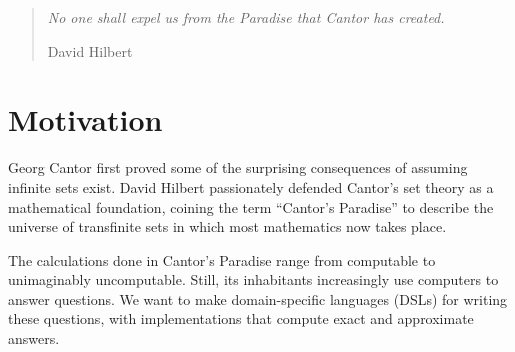 
\newcommand{\ftargetlang}{\ensuremath{\lambda_{\mathrm{ZFC}}^-}\xspace}

\theoremstyle{definition}
\newtheorem{axiom}{Axiom}

\begin{comment}
\begin{abstract}
Applied mathematicians increasingly use computers to answer mathematical questions. We want to provide them domain-specific languages.
The languages should have exact meanings and computational meanings.
Some proof assistants can encode exact mathematics and extract programs, but formalizing the required theorems can take years.

As an alternative, we develop \targetlang, a $\lambda$-calculus that contains infinite sets as values, in which to express exact mathematics and gradually change infinite calculations to computable ones. We define it as a conservative extension of set theory, and prove that most contemporary theorems apply directly to \targetlang terms.

We demonstrate \targetlang's expressiveness by coding up the real numbers, arithmetic and limits. We demonstrate that it makes deriving computational meaning easier by defining a monad in it for expressing limits, and using standard topological theorems to derive a computable replacement.
\end{abstract}
\keywords Lambda Calculus, Set Theory, Semantics
\end{comment}

\begin{quote}
\textit{No one shall expel us from the Paradise that Cantor has created.}

\hfill David Hilbert
\end{quote}

\section{Motivation}

Georg Cantor first proved some of the surprising consequences of assuming infinite sets exist.
David Hilbert passionately defended Cantor's set theory as a mathematical foundation, coining the term ``Cantor's Paradise'' to describe the universe of transfinite sets in which most mathematics now takes place.

The calculations done in Cantor's Paradise range from computable to unimaginably uncomputable. Still, its inhabitants increasingly use computers to answer questions. We want to make domain-specific languages (DSLs) for writing these questions, with implementations that compute exact and approximate answers.

